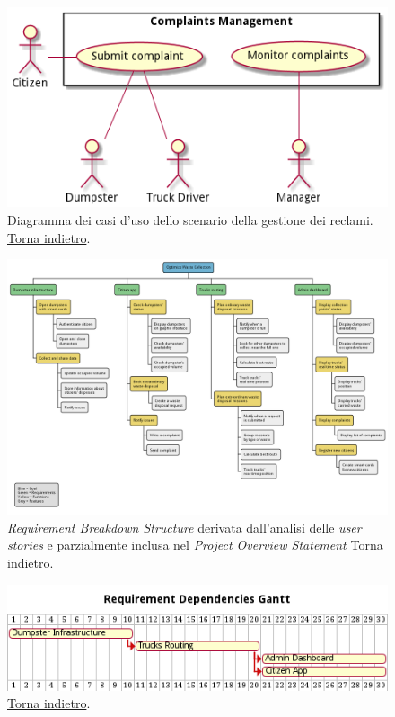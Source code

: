 \begin{figure}[H]
    \centering
    \includegraphics[width=\textwidth]{uml/complaints-use-cases.pm}
    \caption{Diagramma dei casi d'uso dello scenario della gestione dei reclami. \hyperlink{back:uml/complaints-use-cases}{Torna indietro}.}
    \label{fig:uml/complaints-use-cases}
\end{figure}


\begin{figure}[H]
    \centering
    \includegraphics[width=\textwidth]{uml/requirement-breakdown-structure.pm}
    \caption{\textit{Requirement Breakdown Structure} derivata dall'analisi delle \textit{user stories} e parzialmente inclusa nel \textit{Project Overview Statement}   \hyperlink{back:uml/requirement-breakdown-structure}{Torna indietro}.}
    \label{fig:uml/requirement-breakdown-structure}
\end{figure}


\begin{figure}[H]
    \centering
    \includegraphics[width=\textwidth]{uml/gantt-requirements-dependencies.pm}
    \caption{ \hyperlink{back:uml/gantt-requirements-dependencies}{Torna indietro}.}
    \label{fig:uml/gantt-requirements-dependencies}
\end{figure}


